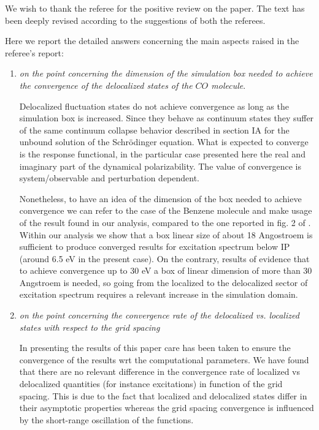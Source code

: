 \documentclass[11pt,a4paper]{article}
\begin{document}
We wish to thank the referee for the positive review on the paper. The text has been deeply revised according to the suggestions of both the referees.

Here we report the detailed answers concerning the main aspects raised in the referee's report:
\begin{enumerate}
  \item \emph{on the point concerning the dimension of the simulation box needed to achieve the convergence of the delocalized states of the $CO$ molecule}.

  Delocalized fluctuation states do not achieve convergence as long as the simulation box is increased. Since they behave as continuum states they suffer of the same continuum collapse behavior described in section IA for the unbound solution of the Schr\"odinger equation. What is expected to converge is the response functional, in the particular case presented here the real and imaginary part of the dynamical polarizability.
  The value of convergence is system/observable and perturbation dependent.

  Nonetheless, to have an idea of the dimension of the box needed to achieve convergence we can refer to the case of the Benzene molecule and make usage
  of the result found in our analysis, compared to the one reported in fig. 2 of \cite{baroni2008}. Within our analysis we show that a box linear size of about 18 Angostroem is sufficient to produce converged results for excitation spectrum below IP (around 6.5 eV in the present case). On the contrary, results of \cite{baroni2008} evidence that to achieve convergence up to 30 eV a box of linear dimension of more than 30 Angstroem is needed, so going from the localized to the delocalized sector of excitation spectrum requires a relevant increase in the simulation domain.

  \item \emph{on the point concerning the convergence rate of the delocalized vs. localized states with respect
  to the grid spacing}

 In presenting the results of this paper care has been taken to ensure the convergence of the results wrt the computational parameters. We have found that there are no relevant difference in the convergence rate of localized vs delocalized quantities (for instance excitations) in function of the grid spacing. This is due to the fact that localized and delocalized states differ in their asymptotic properties whereas the grid spacing convergence is influenced by the short-range oscillation of the functions.


\end{enumerate}
\end{document}
